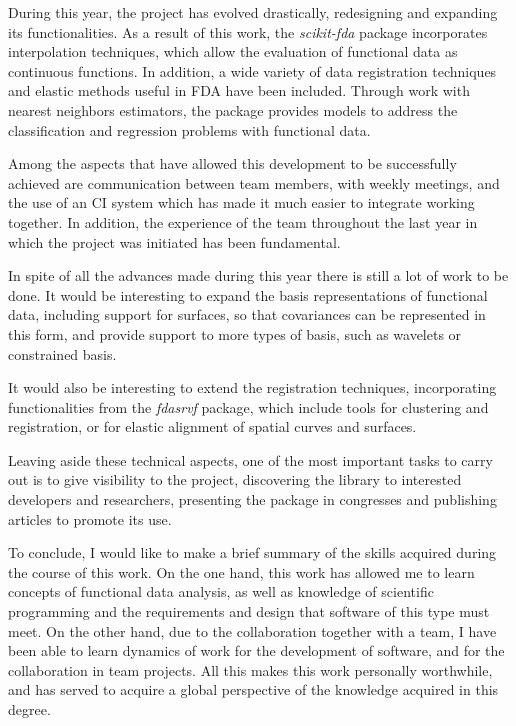 
During this year, the project has evolved drastically, redesigning and expanding
its functionalities.
As a result of this work, the \textit{scikit-fda} package incorporates
interpolation techniques, which allow the evaluation of functional data as
continuous functions. In addition, a wide variety of data registration
techniques and elastic methods useful in FDA have been included.
Through work with nearest neighbors estimators,
the package provides models to address the classification and regression problems
with functional data.

Among the aspects that have allowed this development to be successfully achieved
are communication between team members, with weekly meetings, and the use of
an CI system which has made it much easier to integrate working together.
In addition, the experience of the team throughout the last year in which the
project was initiated has been fundamental.

In spite of all the advances made during this year there is still a lot of work
to be done.
It would be interesting to expand the basis
representations of functional data, including support for surfaces, so that
covariances can be represented in this form, and provide support to more types of basis,
such as wavelets \cite{Morettin2017} or constrained basis\cite{Ramsay2005}.

It would also be interesting to extend the registration techniques,
incorporating functionalities from the \textit{fdasrvf}\cite{fdasrvf} package,
which include tools for clustering and registration, or for elastic
alignment of spatial curves and surfaces.

Leaving aside these technical aspects, one of the most important tasks to carry
out is to give visibility to the project, discovering the library to interested
developers and researchers, presenting the package in congresses and publishing
articles to promote its use.

To conclude, I would like to make a brief summary of the skills acquired during
the course of this work. On the one hand, this work has allowed me to learn concepts
of functional data analysis, as well as knowledge of scientific programming
and the requirements and design that software of this type must meet.
On the other hand, due to the collaboration together with a team,
I have been able to learn dynamics of work for the development of software,
and for the collaboration in team projects.
All this  makes this work personally worthwhile,  and has served to acquire a
global perspective of the knowledge acquired in this degree.
